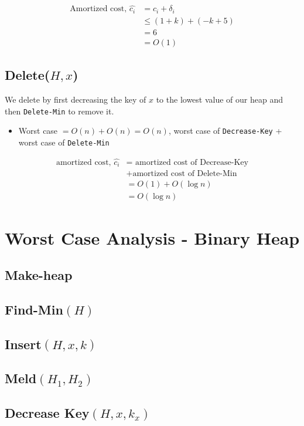 \documentclass[a4paper,oneside,11pt]{article}
\begin{document}
\begin{align*}
  \text{Amortized cost, }\hat{c_i} &= c_i + \delta_i\\
  &\leq (1+k)+(-k+5)\\
  &= 6\\
  &= O(1)
\end{align*}
\subsection*{Delete($H, x$)}
We delete by first decreasing the key of $x$ to the lowest value of our heap and then \texttt{Delete-Min} to remove it.

\begin{itemize}
\item{Worst case} $= O(n) + O(n) = O(n)$, worst case of \texttt{Decrease-Key} + worst case of \texttt{Delete-Min}
\end{itemize}

\begin{align*}
\text{amortized cost, } \hat{c_i} &= \text{ amortized cost of Decrease-Key}\\
&+\text{amortized cost of Delete-Min}\\
&= O(1) + O(\log n)\\
&= O(\log n)
\end{align*}

\section*{Worst Case Analysis - Binary Heap}
\subsection*{Make-heap}

\subsection*{Find-Min$(H)$}

\subsection*{Insert$(H,x,k)$}

\subsection*{Meld$(H_1, H_2)$}

\subsection*{Decrease Key$(H, x, k_x)$}
\end{document}

